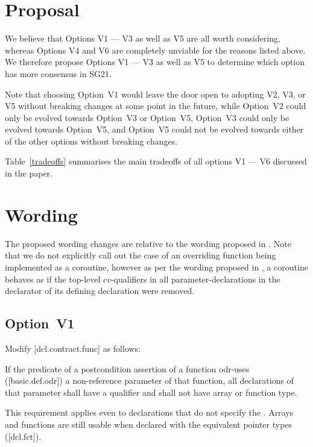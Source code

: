 \section{Proposal}

We believe that Options V1 --- V3 as well as V5 are all worth considering, whereas Options V4 and V6 are completely unviable for the reasons listed above. We therefore propose Options V1 --- V3 as well as V5 to determine which option has more consensus in SG21. 

Note that choosing Option~V1 would leave the door open to adopting V2, V3, or V5 without breaking changes at some point in the future, while Option~V2 could only be evolved towards Option~V3 or Option~V5, Option~V3 could only be evolved towards Option~V5, and Option~V5 could not be evolved towards either of the other options without breaking changes.

Table~\ref{tradeoffs} summarises the main tradeoffs of all options V1 --- V6 discussed in the paper.

\section{Wording}

The proposed wording changes are relative to the wording proposed in \cite{P2900R10}. Note that we do not explicitly call out the case of an overriding function being implemented as a coroutine, however as per the wording proposed in \cite{P2900R10}, a coroutine behaves as if the top-level $cv$-qualifiers in all parameter-declarations in the declarator of its defining declaration were removed.

\subsection*{Option~V1}

Modify [dcl.contract.func] as follows:

\begin{adjustwidth}{0.5cm}{0.5cm}
If the predicate of a postcondition assertion of a function odr-uses ([basic.def.odr]) a
non-reference parameter of that function, all declarations of that parameter shall have a  qualifier and shall not have array or function type.
\begin{note}
This requirement applies even to declarations
that do not specify the . Arrays and functions are still usable when declared with the equivalent pointer types ([dcl.fct]).
\end{note}
\begin{example}
\tcode{[...]}
\end{example}
\end{adjustwidth}

